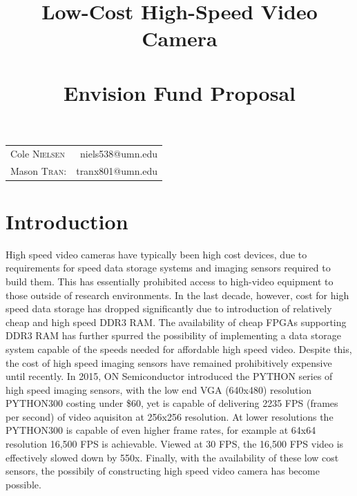 \documentclass[12pt]{article}
\title{\LARGE Low-Cost High-Speed Video Camera\\\adforn{21}\\Envision Fund Proposal}
\date{}
\begin{document}
\maketitle 
\begin{center}
 \begin{tabular}{l r}
   Cole \textsc{Nielsen} & niels538@umn.edu\\ 
   Mason \textsc{Tran}: & tranx801@umn.edu\\ 
\end{tabular}
\end{center}
\pagebreak

\section{Introduction}
High speed video cameras have typically been high cost devices, due to requirements for speed data storage systems and imaging sensors required to build them. This has essentially prohibited access to high-video equipment to those outside of research environments. In the last decade, however, cost for high speed data storage has dropped significantly due to introduction of relatively cheap and high speed DDR3 RAM. The availability of cheap FPGAs supporting DDR3 RAM has further spurred the possibility of implementing a data storage system capable of the speeds needed for affordable high speed video. Despite this, the cost of high speed imaging sensors have remained prohibitively expensive until recently. In 2015, ON Semiconductor introduced the PYTHON series of high speed imaging sensors, with the low end VGA (640x480) resolution PYTHON300 costing under \$60, yet is capable of delivering 2235 FPS (frames per second) of video aquisiton at 256x256 resolution. At lower resolutions the PYTHON300 is capable of even higher frame rates, for example at 64x64 resolution 16,500 FPS is achievable. Viewed at 30 FPS, the 16,500 FPS video is effectively slowed down by 550x. Finally, with the availability of these low cost sensors, the possibily of constructing high speed video camera has become possible. \\\par
\end{document}
